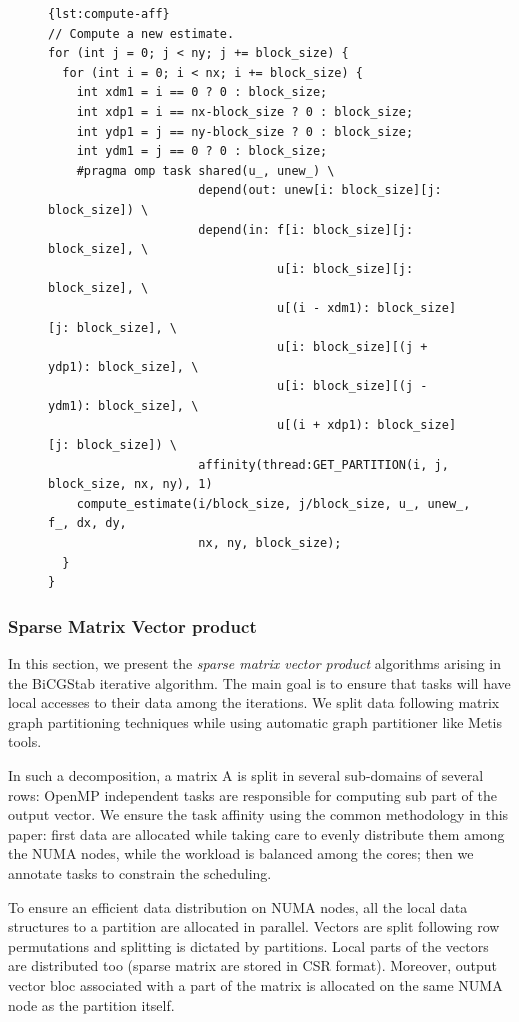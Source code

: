\documentclass{Styles/llncs}
\begin{document}
\begin{figure}[htbp]
\begin{lstlisting}[caption=Example of use of the affinity clause for computation,frame=tlrb,style=smaller,label=lst:compute-aff]{lst:compute-aff}
// Compute a new estimate.
for (int j = 0; j < ny; j += block_size) {
  for (int i = 0; i < nx; i += block_size) {
    int xdm1 = i == 0 ? 0 : block_size;
    int xdp1 = i == nx-block_size ? 0 : block_size;
    int ydp1 = j == ny-block_size ? 0 : block_size;
    int ydm1 = j == 0 ? 0 : block_size;
    #pragma omp task shared(u_, unew_) \
                     depend(out: unew[i: block_size][j: block_size]) \
                     depend(in: f[i: block_size][j: block_size], \
                                u[i: block_size][j: block_size], \
                                u[(i - xdm1): block_size][j: block_size], \
                                u[i: block_size][(j + ydp1): block_size], \
                                u[i: block_size][(j - ydm1): block_size], \
                                u[(i + xdp1): block_size][j: block_size]) \
                     affinity(thread:GET_PARTITION(i, j, block_size, nx, ny), 1)
    compute_estimate(i/block_size, j/block_size, u_, unew_, f_, dx, dy,
                     nx, ny, block_size);
  }
}
\end{lstlisting}
\end{figure}

\subsubsection{Sparse Matrix Vector product}

In this section, we present the \textit{sparse matrix vector product} algorithms arising in the BiCGStab iterative algorithm. The main goal is to ensure that tasks will have local accesses to their data among the iterations.
We split data following matrix graph partitioning techniques \cite{Saad:2003:IMS:829576} while using automatic graph partitioner like Metis~\cite{metis} tools.

In such a decomposition, a matrix A is split in several sub-domains of several rows: OpenMP independent tasks are responsible for computing sub part of the output vector. We ensure the task affinity using the common methodology in this paper: first data are allocated while taking care to evenly distribute them among the NUMA nodes, while the workload is balanced among the cores; then we annotate tasks to constrain the scheduling.

To ensure an efficient data distribution on NUMA nodes, all the local data structures to a partition are allocated in parallel. Vectors are split following row permutations and splitting is dictated by partitions. Local parts of the vectors are distributed too (sparse matrix are stored in CSR format). Moreover, output vector bloc associated with a part of the matrix is allocated on the same NUMA node as the partition itself.
\end{document}

